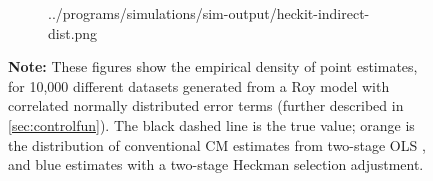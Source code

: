 \begin{figure}[h!]
\begin{subfigure}[c]{0.475\textwidth}
{            ../programs/simulations/sim-output/heckit-indirect-dist.png}
    \end{subfigure}
    \label{fig:cm-heckit-dist}
    \justify
    \footnotesize    
    \textbf{Note:}
    These figures show the empirical density of point estimates, for 10,000 different datasets generated from a Roy model with correlated normally distributed error terms (further described in \autoref{sec:controlfun}).
    The black dashed line is the true value;
    orange is the distribution of conventional CM estimates from two-stage OLS \citep{imai2010identification},
    and blue estimates with a two-stage Heckman selection adjustment.
\end{figure}
